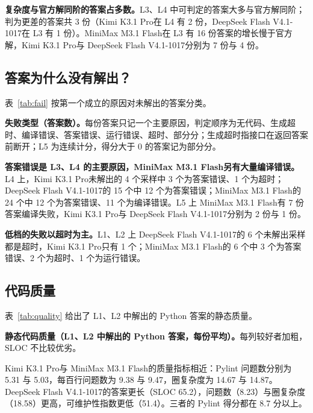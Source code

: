 \documentclass[11pt,a4paper,fontset=none]{ctexart}
\newcommand{\kimi}{Kimi K3.1 Pro}
\newcommand{\mini}{MiniMax M3.1 Flash}
\newcommand{\ds}{DeepSeek Flash V4.1-1017}
\newcommand{\lead}[1]{\textbf{#1}\quad}
\begin{document}
\lead{复杂度与官方解同阶的答案占多数。}L3、L4 中可判定的答案大多与官方解同阶；判为更差的答案共 3 份（\kimi 在 L4 有 2 份，\ds 在 L3 有 1 份）。\mini 在 L3 有 16 份答案的增长慢于官方解，\kimi 与 \ds 分别为 7 份与 4 份。

\subsection{答案为什么没有解出？}

表~\ref{tab:fail} 按第一个成立的原因对未解出的答案分类。

\begin{table}[t]
  \centering
  \caption{\textbf{失败类型（答案数）。}每份答案只记一个主要原因，判定顺序为无代码、生成超时、编译错误、答案错误、运行错误、超时、部分分；生成超时指接口在返回答案前断开；L5 为连续计分，得分大于 0 的答案记为部分分。}
  \label{tab:fail}
  \small
  \begin{adjustbox}{max width=\linewidth}\end{adjustbox}
\end{table}

\lead{答案错误是 L3、L4 的主要原因，\mini 另有大量编译错误。}L4 上，\kimi 未解出的 4 个采样中 3 个为答案错误、1 个为超时；\ds 的 15 个中 12 个为答案错误；\mini 的 24 个中 12 个为答案错误、11 个为编译错误。L5 上 \mini 有 7 份答案编译失败，\kimi 与 \ds 分别为 2 份与 1 份。

\lead{低档的失败以超时为主。}L1、L2 上 \ds 的 6 个未解出采样都是超时，\kimi 只有 1 个；\mini 的 6 个中 3 个为答案错误、2 个为超时、1 个为运行错误。

\subsection{代码质量}

表~\ref{tab:quality} 给出了 L1、L2 中解出的 Python 答案的静态质量。

\begin{table}[t]
  \centering
  \caption{\textbf{静态代码质量（L1、L2 中解出的 Python 答案，每份平均）。}每列较好者加粗，SLOC 不比较优劣。}
  \label{tab:quality}
  \small
  
\end{table}

\kimi 与 \mini 的质量指标相近：Pylint 问题数分别为 5.31 与 5.03，每百行问题数为 9.38 与 9.47，圈复杂度为 14.67 与 14.87。\ds 的答案更长（SLOC 65.2），问题数（8.23）与圈复杂度（18.58）更高，可维护性指数更低（51.4）。三者的 Pylint 得分都在 8.7 分以上。
\end{document}
